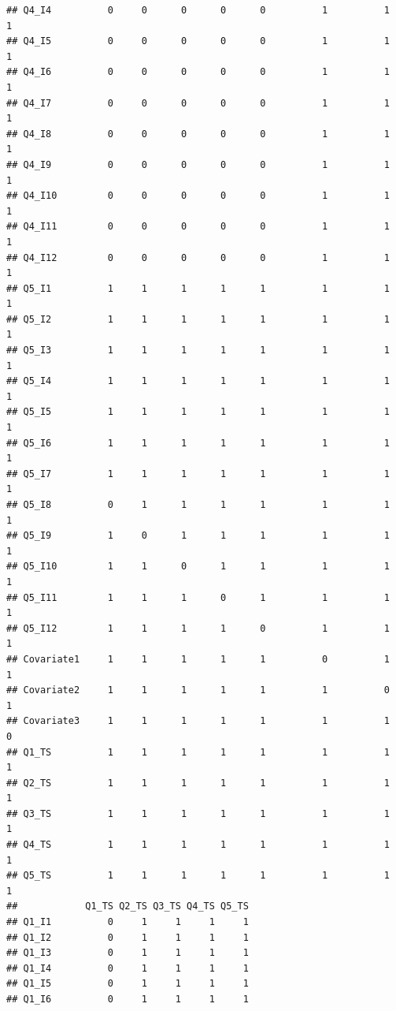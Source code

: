 \documentclass[
]{book}
\begin{document}
\begin{verbatim}
## Q4_I4          0     0      0      0      0          1          1          1
## Q4_I5          0     0      0      0      0          1          1          1
## Q4_I6          0     0      0      0      0          1          1          1
## Q4_I7          0     0      0      0      0          1          1          1
## Q4_I8          0     0      0      0      0          1          1          1
## Q4_I9          0     0      0      0      0          1          1          1
## Q4_I10         0     0      0      0      0          1          1          1
## Q4_I11         0     0      0      0      0          1          1          1
## Q4_I12         0     0      0      0      0          1          1          1
## Q5_I1          1     1      1      1      1          1          1          1
## Q5_I2          1     1      1      1      1          1          1          1
## Q5_I3          1     1      1      1      1          1          1          1
## Q5_I4          1     1      1      1      1          1          1          1
## Q5_I5          1     1      1      1      1          1          1          1
## Q5_I6          1     1      1      1      1          1          1          1
## Q5_I7          1     1      1      1      1          1          1          1
## Q5_I8          0     1      1      1      1          1          1          1
## Q5_I9          1     0      1      1      1          1          1          1
## Q5_I10         1     1      0      1      1          1          1          1
## Q5_I11         1     1      1      0      1          1          1          1
## Q5_I12         1     1      1      1      0          1          1          1
## Covariate1     1     1      1      1      1          0          1          1
## Covariate2     1     1      1      1      1          1          0          1
## Covariate3     1     1      1      1      1          1          1          0
## Q1_TS          1     1      1      1      1          1          1          1
## Q2_TS          1     1      1      1      1          1          1          1
## Q3_TS          1     1      1      1      1          1          1          1
## Q4_TS          1     1      1      1      1          1          1          1
## Q5_TS          1     1      1      1      1          1          1          1
##            Q1_TS Q2_TS Q3_TS Q4_TS Q5_TS
## Q1_I1          0     1     1     1     1
## Q1_I2          0     1     1     1     1
## Q1_I3          0     1     1     1     1
## Q1_I4          0     1     1     1     1
## Q1_I5          0     1     1     1     1
## Q1_I6          0     1     1     1     1

\end{verbatim}
\end{document}

